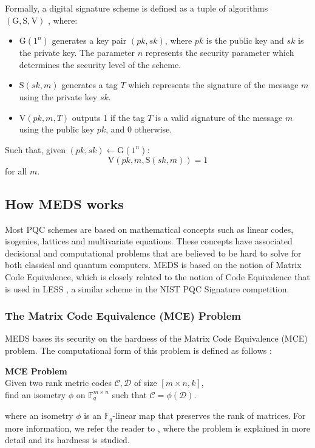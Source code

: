 \documentclass[11pt,a4paper]{report}
\begin{document}
Formally, a digital signature scheme is defined as a tuple of algorithms $(\text{G}, \text{S}, \text{V})$ \cite{goldwasser2008lecture}, where:
\begin{itemize}
  \item $\text{G}(1^n)$ generates a key pair $(pk, sk)$, where $pk$ is the public key and $sk$ is the private key. The parameter $n$ represents the security parameter which determines the security level of the scheme.
  \item $\text{S}(sk, m)$ generates a tag $T$ which represents the signature of the message $m$ using the private key $sk$.
  \item $\text{V}(pk, m, T)$ outputs 1 if the tag $T$ is a valid signature of the message $m$ using the public key $pk$, and 0 otherwise.
\end{itemize}
Such that, given $(pk, sk) \leftarrow \text{G}(1^n)$:
\[
  \text{V}(pk, m, \text{S}(sk, m)) = 1
\]
for all $m$.

\subsection{How MEDS works}
\label{sec:medsworks}
Most PQC schemes are based on mathematical concepts such as linear codes, isogenies, lattices and multivariate equations. These concepts have associated decisional and computational problems that are believed to be hard to solve for both classical and quantum computers. MEDS is based on the notion of Matrix Code Equivalence, which is closely related to the notion of Code Equivalence that is used in LESS \cite{biasse2020less}, a similar scheme in the NIST PQC Signature competition.

\subsubsection{The Matrix Code Equivalence (MCE) Problem}
MEDS bases its security on the hardness of the Matrix Code Equivalence (MCE) problem. The computational form of this problem is defined as follows \cite{chou2023meds}:
\begin{center}
  \textbf{MCE Problem}\\
  Given two rank metric codes $\mathcal{C}, \mathcal{D}$ of size $[m \times n, k]$,\\
  find an isometry $\phi$ on $\mathbb{F}_q^{m \times n}$ such that $\mathcal{C} = \phi(\mathcal{D})$.
\end{center}
where an isometry $\phi$ is an $\mathbb{F}_q$-linear map that preserves the rank of matrices. For more information, we refer the reader to \cite{reijnders2024hardness}, where the problem is explained in more detail and its hardness is studied.
\end{document}
